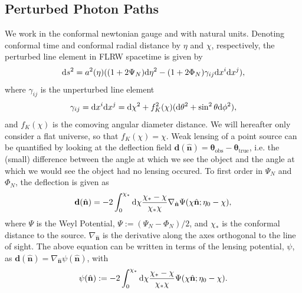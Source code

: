 \documentclass[11pt]{article} %
\DeclareRobustCommand{\d}{\ifmmode\text{d}\else d\fi}
\begin{document}
\subsection{Perturbed Photon Paths}
We work in the conformal newtonian gauge and with natural units. Denoting conformal time and conformal radial distance by $\eta$ and $\chi$, respectively, the perturbed line element in FLRW spacetime is given by
\begin{equation}
    \d s^2 = a^2(\eta)((1 + 2\Psi_N) \d \eta^2 - (1 + 2\Phi_N) \gamma_{ij}\d x^i \d x^j),
\end{equation}
where $\gamma_{ij}$ is the unperturbed line element
\begin{equation}
    \gamma_{ij} = \d x^i \d x^j = \d \chi^2 + f^2_K(\chi)(\d \theta^2 + \sin ^2 \theta \d \phi ^2),
\end{equation}
and $f_K(\chi)$ is the comoving angular diameter distance. We will hereafter only consider a flat universe, so that $f_K(\chi) = \chi$. Weak lensing of a point source can be quantified by looking at the deflection field $\mathbf d (\hat{\mathbf n}) = \mathbf \theta_{\text{obs}} - \mathbf \theta_{\text{true}}$, i.e. the (small) difference between the angle at which we see the object and the angle at which we would see the object had no lensing occured. To first order in $\Psi_N$ and $\Phi_N$, the deflection is given as \cite{dodelson2020modern}
\begin{equation}
    \mathbf d(\hat{\mathbf n}) = -2 \int_0^{\chi_*}\d \chi \frac{\chi_* - \chi}{\chi_*\chi}\nabla_{\hat{\mathbf n}}\Psi(\chi\hat{\mathbf n};\eta_0 - \chi),
\end{equation}
where $\Psi$ is the Weyl Potential, $\Psi := (\Psi_N - \Phi_N)/2$, and $\chi_*$ is the conformal distance to the source. $\nabla_{\hat{\mathbf n}}$ is the derivative along the axes orthogonal to the line of sight. The above equation can be written in terms of the lensing potential, $\psi$, as $\mathbf d (\hat{\mathbf n}) = \nabla_{\hat{\mathbf n}} \psi(\hat{\mathbf n})$, with
\begin{equation}
    \psi(\hat {\mathbf n}) := -2 \int_0^{\chi_*}\d \chi \frac{\chi_* - \chi}{\chi_*\chi}\Psi(\chi\hat{\mathbf n};\eta_0 - \chi).
\end{equation}
\end{document}
